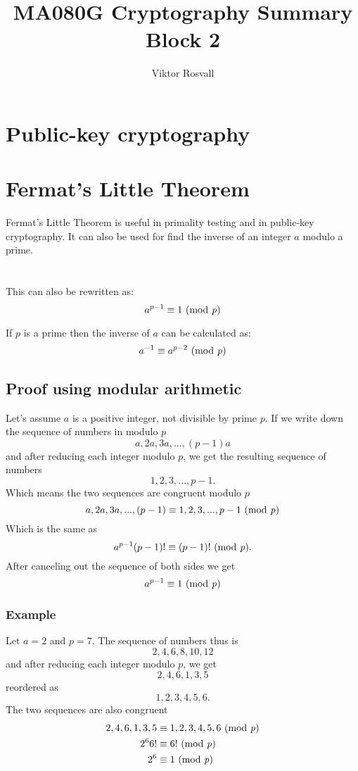 \documentclass{article}
\title{MA080G Cryptography Summary Block 2}
\author{Viktor Rosvall}
\begin{document}
	\maketitle
	
	\section*{Public-key cryptography}
	
	
	\section*{Fermat's Little Theorem} 
	Fermat's Little Theorem is useful in primality testing and in public-key cryptography. It can also be used for find the inverse of  an integer $a$ modulo a prime. \cite{fermatsummary}
	\\
	\\
	\\

	This can also be rewritten as: 
	$$
	a^{p-1} \equiv 1 \text{ (mod \textit{p})}
	$$
	
	If $p$ is a prime then the inverse of $a$ can be calculated as:
	$$
	a^{-1} \equiv a^{p-2} \text{ (mod \textit{p})}
	$$
	
 	\subsection*{Proof using modular arithmetic \cite{fermatproof}}
 	Let's assume $a$ is a positive integer, not divisible by prime $p$. If we write down the sequence of numbers in modulo $p$
 	$$
 	a,2a,3a,...,(p-1)a
 	$$
 	and after reducing each integer modulo $p$, we get the resulting sequence of numbers
 	$$
 	1,2,3,...,p-1.
 	$$
 	Which means the two sequences are congruent modulo $p$ 
 	$$
 	a,2a,3a,...,(p-1) \equiv 1,2,3,...,p-1 \text{ (mod \textit{p})}
 	$$
 	Which is the same as 
 	$$
 	a^{p-1}(p-1)! \equiv (p-1)! \text{ (mod \textit{p})}.
 	$$
 	After canceling out the sequence of both sides we get
 	$$
	a^{p-1} \equiv 1 \text{ (mod \textit{p})}
 	$$
 	
 	\subsubsection*{Example}
 	Let $a = 2$ and $ p = 7$. The sequence of numbers thus is
 	$$
 	2,4,6,8,10,12
 	$$
 	and after reducing each integer modulo $p$, we get
 	$$
 	2,4,6,1,3,5
 	$$
 	reordered as
 	$$
 	1,2,3,4,5,6.
 	$$
 	The two sequences are also congruent 
 	\[
 	\begin{split}
	 	2,4,6,1,3,5 &\equiv 1,2,3,4,5,6 \text{ (mod \textit{p})}\\
	 	2^6 6! &\equiv 6! \text{ (mod \textit{p})} \\
	 	2^6 &\equiv 1 \text{ (mod \textit{p})}
 	\end{split}
 	\]
 	
\end{document}
